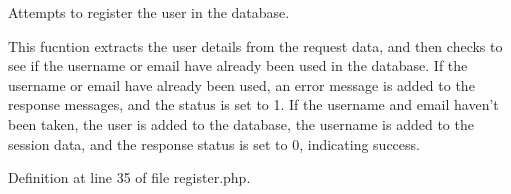 \-Attempts to register the user in the database. 

\-This fucntion extracts the user details from the request data, and then checks to see if the username or email have already been used in the database. \-If the username or email have already been used, an error message is added to the response messages, and the status is set to 1. \-If the username and email haven't been taken, the user is added to the database, the username is added to the session data, and the response status is set to 0, indicating success. 

\-Definition at line 35 of file register.\-php.

